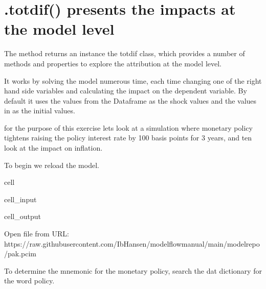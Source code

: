 \documentclass[letterpaper,10pt,english]{jupyterBook}
\begin{document}
\section{.totdif() presents the impacts at the model level}
\label{\detokenize{content/06_ModelAnalytics/Attribution:totdif-presents-the-impacts-at-the-model-level}}
\sphinxAtStartPar
The method  returns an instance  the totdif class, which provides a number of methods and properties to explore the attribution at the model level.

\sphinxAtStartPar
It works by solving the model numerous time, each time changing one of the right hand side variables and calculating the impact on the dependent variable. By default it uses the values from the  Dataframe as the shock values and the values in  as the initial values.

\sphinxAtStartPar
for the purpose of this exercise lets look at a simulation where monetary policy tightens raising the policy interest rate by 100 basis points for 3 years, and ten look at the impact on inflation.

\sphinxAtStartPar
To begin we reload the model.

\begin{sphinxuseclass}{cell}\begin{sphinxVerbatimInput}

\begin{sphinxuseclass}{cell_input}
\begin{sphinxVerbatim}[commandchars=\\\{\}]
  
\end{sphinxVerbatim}

\end{sphinxuseclass}\end{sphinxVerbatimInput}
\begin{sphinxVerbatimOutput}

\begin{sphinxuseclass}{cell_output}
\begin{sphinxVerbatim}[commandchars=\\\{\}]
Open file from URL:  https://raw.githubusercontent.com/IbHansen/modelflow\PYGZhy{}manual/main/model\PYGZus{}repo/pak.pcim
\end{sphinxVerbatim}

\end{sphinxuseclass}\end{sphinxVerbatimOutput}

\end{sphinxuseclass}
\sphinxAtStartPar
To determine the mnemonic for the monetary policy, search the dat dictionary for the word policy.
\end{document}
